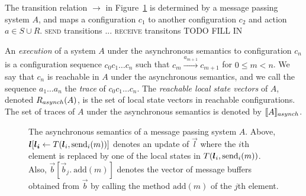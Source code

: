 The transition relation $\rightarrow$ in Figure~\ref{fig:asynch-sem} is determined by a message passing system $A$, and maps
a configuration $c_1$ to another configuration $c_2$ and action $a\in S\cup R$.
\textsc{send} transitions ... \textsc{receive} transitons TODO FILL IN

An \emph{execution} of a system $A$ under the asynchronous semantics to configuration ${c}_n$
is a configuration sequence ${c}_0 {c}_1 \ldots {c}_n$ such that
$  {c}_m \xrightarrow{a_{m+1}} {c}_{m+1}$
for $0 \le m < n$. We say that ${c}_n$ is reachable in $A$ under the asynchronous semantics, and we call
the sequence $a_1 \ldots a_n$ the \emph{trace} of ${c}_0 {c}_1 \ldots
{c}_n$. The \emph{reachable local state vectors} of $A$, denoted $\asynch{R}(A)$, is the
set of local state vectors in reachable configurations.
%
The set of traces of $A$ under the asynchronous semantics is denoted by $\asynchTr{A}$.

\begin{figure} [t]
\footnotesize{
  \centering
  \begin{mathpar}
    
  \end{mathpar}
  }
  \caption{The asynchronous semantics of a message passing system $A$. Above, $\vec{l}[\vec{l_i}\gets T(\vec{l}_i,\send{i}{m})]$ denotes an update of $\vec{l}$ where the $i$th element is replaced by one of the local states in $T(\vec{l}_i,\send{i}{m})$. Also, $\vec{b}[\vec{b}_j.\ \mathrm{add}(m)]$ denotes the vector of message buffers obtained from $\vec{b}$ by calling the method $\mathrm{add}(m)$ of the $j$th element.
  }
  \label{fig:asynch-sem}
\end{figure}


